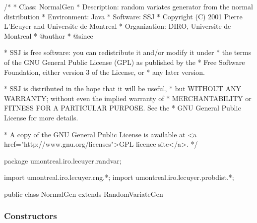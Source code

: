 \begin{code}
\begin{hide}
/*
 * Class:        NormalGen
 * Description:  random variates generator from the normal distribution
 * Environment:  Java
 * Software:     SSJ 
 * Copyright (C) 2001  Pierre L'Ecuyer and Universite de Montreal
 * Organization: DIRO, Universite de Montreal
 * @author       
 * @since

 * SSJ is free software: you can redistribute it and/or modify it under
 * the terms of the GNU General Public License (GPL) as published by the
 * Free Software Foundation, either version 3 of the License, or
 * any later version.

 * SSJ is distributed in the hope that it will be useful,
 * but WITHOUT ANY WARRANTY; without even the implied warranty of
 * MERCHANTABILITY or FITNESS FOR A PARTICULAR PURPOSE.  See the
 * GNU General Public License for more details.

 * A copy of the GNU General Public License is available at
   <a href="http://www.gnu.org/licenses">GPL licence site</a>.
 */
\end{hide}
package umontreal.iro.lecuyer.randvar;\begin{hide}
import umontreal.iro.lecuyer.rng.*;
import umontreal.iro.lecuyer.probdist.*;
\end{hide}

public class NormalGen extends RandomVariateGen \begin{hide} {
   protected double mu;
   protected double sigma = -1.0;
\end{hide}\end{code}

\subsubsection* {Constructors}

